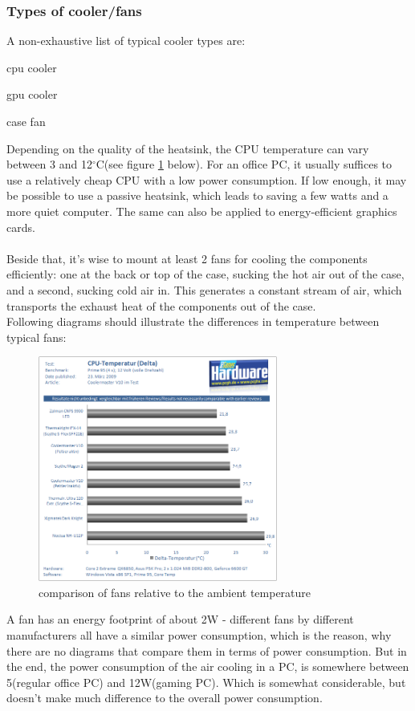 \subsubsection{Types of cooler/fans}
A non-exhaustive list of typical cooler types are:
\begin{compactitem}
  \item cpu cooler
  \item gpu cooler
  \item case fan
\end{compactitem}
Depending on the quality of the heatsink, the CPU temperature can vary between 3 and 12$^\circ$C(see figure \ref{fig:comparison_fans} below). For an office PC, it usually suffices to use a relatively cheap CPU
with a low power consumption. If low enough, it may be possible to use a passive heatsink, which leads to saving a few watts and a more quiet computer.
The same can also be applied to energy-efficient graphics cards.
\\\\
Beside that, it's wise to mount at least 2 fans for cooling the components efficiently: one at the back or top of the case, sucking the hot air out of the case, and a second, 
sucking cold air in. This generates a constant stream of air, which transports the exhaust heat of the components out of the case.\\
Following diagrams should illustrate the differences in temperature between typical fans:\\
\begin{figure}[H]
  \centering
  \includegraphics[width=0.7\textwidth]{./graphics/Temperatur}
  \caption{comparison of fans relative to the ambient temperature}
  \label{fig:comparison_fans}
\end{figure}
A fan has an energy footprint of about 2W - different fans by different manufacturers all have a similar power consumption, which is the reason, why there are no diagrams that compare them
in terms of power consumption. But in the end, the power consumption of the air cooling in a PC, is somewhere between 5(regular office PC) and 12W(gaming PC). Which is somewhat considerable, 
but doesn't make much difference to the overall power consumption. 


